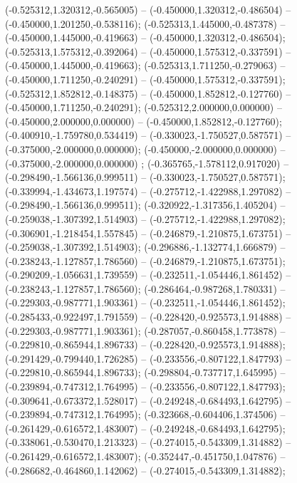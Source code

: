  (-0.525312,1.320312,-0.565005) -- (-0.450000,1.320312,-0.486504) -- (-0.450000,1.201250,-0.538116);
 (-0.525313,1.445000,-0.487378) -- (-0.450000,1.445000,-0.419663) -- (-0.450000,1.320312,-0.486504);
 (-0.525313,1.575312,-0.392064) -- (-0.450000,1.575312,-0.337591) -- (-0.450000,1.445000,-0.419663);
 (-0.525313,1.711250,-0.279063) -- (-0.450000,1.711250,-0.240291) -- (-0.450000,1.575312,-0.337591);
 (-0.525312,1.852812,-0.148375) -- (-0.450000,1.852812,-0.127760) -- (-0.450000,1.711250,-0.240291);
 (-0.525312,2.000000,0.000000) -- (-0.450000,2.000000,0.000000) -- (-0.450000,1.852812,-0.127760);
 (-0.400910,-1.759780,0.534419) -- (-0.330023,-1.750527,0.587571) -- (-0.375000,-2.000000,0.000000);
 (-0.450000,-2.000000,0.000000) -- (-0.375000,-2.000000,0.000000) ;
 (-0.365765,-1.578112,0.917020) -- (-0.298490,-1.566136,0.999511) -- (-0.330023,-1.750527,0.587571);
 (-0.339994,-1.434673,1.197574) -- (-0.275712,-1.422988,1.297082) -- (-0.298490,-1.566136,0.999511);
 (-0.320922,-1.317356,1.405204) -- (-0.259038,-1.307392,1.514903) -- (-0.275712,-1.422988,1.297082);
 (-0.306901,-1.218454,1.557845) -- (-0.246879,-1.210875,1.673751) -- (-0.259038,-1.307392,1.514903);
 (-0.296886,-1.132774,1.666879) -- (-0.238243,-1.127857,1.786560) -- (-0.246879,-1.210875,1.673751);
 (-0.290209,-1.056631,1.739559) -- (-0.232511,-1.054446,1.861452) -- (-0.238243,-1.127857,1.786560);
 (-0.286464,-0.987268,1.780331) -- (-0.229303,-0.987771,1.903361) -- (-0.232511,-1.054446,1.861452);
 (-0.285433,-0.922497,1.791559) -- (-0.228420,-0.925573,1.914888) -- (-0.229303,-0.987771,1.903361);
 (-0.287057,-0.860458,1.773878) -- (-0.229810,-0.865944,1.896733) -- (-0.228420,-0.925573,1.914888);
 (-0.291429,-0.799440,1.726285) -- (-0.233556,-0.807122,1.847793) -- (-0.229810,-0.865944,1.896733);
 (-0.298804,-0.737717,1.645995) -- (-0.239894,-0.747312,1.764995) -- (-0.233556,-0.807122,1.847793);
 (-0.309641,-0.673372,1.528017) -- (-0.249248,-0.684493,1.642795) -- (-0.239894,-0.747312,1.764995);
 (-0.323668,-0.604406,1.374506) -- (-0.261429,-0.616572,1.483007) -- (-0.249248,-0.684493,1.642795);
 (-0.338061,-0.530470,1.213323) -- (-0.274015,-0.543309,1.314882) -- (-0.261429,-0.616572,1.483007);
 (-0.352447,-0.451750,1.047876) -- (-0.286682,-0.464860,1.142062) -- (-0.274015,-0.543309,1.314882);
